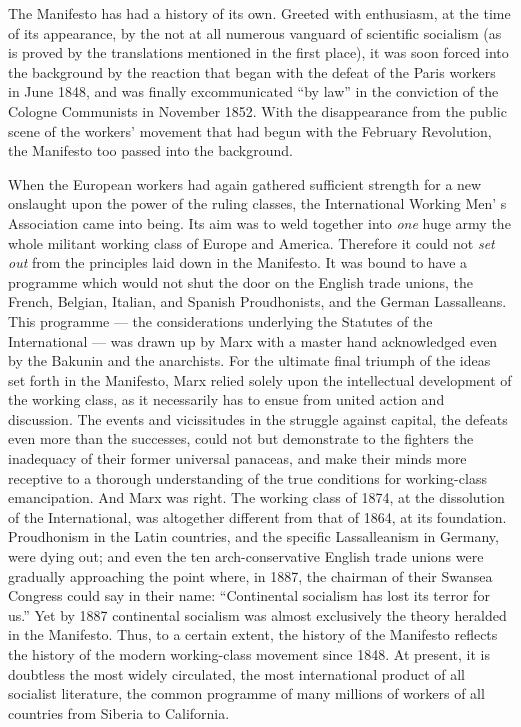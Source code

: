 The Manifesto has had a history of its own. Greeted with enthusiasm, at the time of its appearance, by the not at all numerous vanguard of scientific socialism (as is proved by the translations mentioned in the first place), it was soon forced into the background by the reaction that began with the defeat of the Paris workers in June 1848, and was finally excommunicated ``by law'' in the conviction of the Cologne Communists in November 1852. With the disappearance from the public scene of the workers’ movement that had begun with the February Revolution, the Manifesto too passed into the background. 

When the European workers had again gathered sufficient strength for a new onslaught upon the power of the ruling classes, the International Working Men’ s Association came into being. Its aim was to weld together into \emph{one} huge army the whole militant working class of Europe and America. Therefore it could not \emph{set out} from the principles laid down in the Manifesto. It was bound to have a programme which would not shut the door on the English trade unions, the French, Belgian, Italian, and Spanish Proudhonists, and the German Lassalleans. This programme --- the considerations underlying the Statutes of the International --- was drawn up by Marx with a master hand acknowledged even by the Bakunin and the anarchists. For the ultimate final triumph of the ideas set forth in the Manifesto, Marx relied solely upon the intellectual development of the working class, as it necessarily has to ensue from united action and discussion. The events and vicissitudes in the struggle against capital, the defeats even more than the successes, could not but demonstrate to the fighters the inadequacy of their former universal panaceas, and make their minds more receptive to a thorough understanding of the true conditions for working-class emancipation. And Marx was right. The working class of 1874, at the dissolution of the International, was altogether different from that of 1864, at its foundation. Proudhonism in the Latin countries, and the specific Lassalleanism in Germany, were dying out; and even the ten arch-conservative English trade unions were gradually approaching the point where, in 1887, the chairman of their Swansea Congress could say in their name: ``Continental socialism has lost its terror for us.'' Yet by 1887 continental socialism was almost exclusively the theory heralded in the Manifesto. Thus, to a certain extent, the history of the Manifesto reflects the history of the modern working-class movement since 1848. At present, it is doubtless the most widely circulated, the most international product of all socialist literature, the common programme of many millions of workers of all countries from Siberia to California. 

